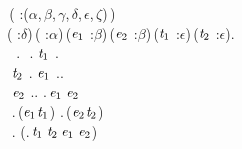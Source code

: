 \begin{holmath}
    \,( :(\ensuremath{\alpha},\,\ensuremath{\beta},\,\ensuremath{\gamma},\,\ensuremath{\delta},\,\ensuremath{\epsilon},\,\ensuremath{\zeta})\,)\,\HOLSymConst{\HOLTokenEquiv{}}\\
\HOLSymConst{\HOLTokenForall{}}( :\ensuremath{\delta})\,( :\ensuremath{\alpha})\,(\ensuremath{\HOLBoundVar{e}\sb{\mathrm{1}}} :\ensuremath{\beta})\,(\ensuremath{\HOLBoundVar{e}\sb{\mathrm{2}}} :\ensuremath{\beta})\,(\ensuremath{\HOLBoundVar{t}\sb{\mathrm{1}}} :\ensuremath{\epsilon})\,(\ensuremath{\HOLBoundVar{t}\sb{\mathrm{2}}} :\ensuremath{\epsilon}).\\
\,\,\,\HOLSymConst{\HOLTokenIn{}}\,.\,\HOLSymConst{\HOLTokenConj{}}\,\,\HOLSymConst{\HOLTokenIn{}}\,.\,\HOLSymConst{\HOLTokenConj{}}\,\ensuremath{\HOLBoundVar{t}\sb{\mathrm{1}}}\,\HOLSymConst{\HOLTokenIn{}}\,.\,\HOLSymConst{\HOLTokenConj{}}\\
\,\,\ensuremath{\HOLBoundVar{t}\sb{\mathrm{2}}}\,\HOLSymConst{\HOLTokenIn{}}\,.\,\HOLSymConst{\HOLTokenConj{}}\,\ensuremath{\HOLBoundVar{e}\sb{\mathrm{1}}}\,\HOLSymConst{\HOLTokenIn{}}\,..\,\HOLSymConst{\HOLTokenConj{}}\\
\,\,\ensuremath{\HOLBoundVar{e}\sb{\mathrm{2}}}\,\HOLSymConst{\HOLTokenIn{}}\,..\,\HOLSymConst{\HOLTokenConj{}}\,.\,\ensuremath{\HOLBoundVar{e}\sb{\mathrm{1}}}\,\ensuremath{\HOLBoundVar{e}\sb{\mathrm{2}}}\,\HOLSymConst{\HOLTokenConj{}}\\
\,\,.\,(\HOLSymConst{,}\HOLSymConst{,}\ensuremath{\HOLBoundVar{e}\sb{\mathrm{1}}}\HOLSymConst{,}\ensuremath{\HOLBoundVar{t}\sb{\mathrm{1}}})\,\HOLSymConst{\HOLTokenConj{}}\,.\,(\HOLSymConst{,}\HOLSymConst{,}\ensuremath{\HOLBoundVar{e}\sb{\mathrm{2}}}\HOLSymConst{,}\ensuremath{\HOLBoundVar{t}\sb{\mathrm{2}}})\,\HOLSymConst{\HOLTokenImp{}}\\
\,\,.\,\,(.\,\ensuremath{\HOLBoundVar{t}\sb{\mathrm{1}}}\,\ensuremath{\HOLBoundVar{t}\sb{\mathrm{2}}}\,\ensuremath{\HOLBoundVar{e}\sb{\mathrm{1}}}\,\ensuremath{\HOLBoundVar{e}\sb{\mathrm{2}}})
\end{holmath}  
